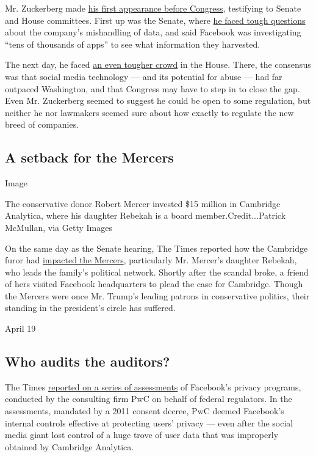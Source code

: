 Mr. Zuckerberg made
\href{https://www.nytimes.com/2018/04/10/us/politics/zuckerberg-facebook-senate-hearing.html}{his
first appearance before Congress}, testifying to Senate and House
committees. First up was the Senate, where
\href{https://www.nytimes.com/2018/04/10/us/politics/mark-zuckerberg-testimony.html}{he
faced tough questions} about the company's mishandling of data, and said
Facebook was investigating ``tens of thousands of apps'' to see what
information they harvested.

The next day, he faced
\href{https://www.nytimes.com/2018/04/11/business/zuckerberg-facebook-congress.html}{an
even tougher crowd} in the House. There, the consensus was that social
media technology --- and its potential for abuse --- had far outpaced
Washington, and that Congress may have to step in to close the gap. Even
Mr. Zuckerberg seemed to suggest he could be open to some regulation,
but neither he nor lawmakers seemed sure about how exactly to regulate
the new breed of companies.

\hypertarget{a-setback-for-the-mercers}{%
\subsection{A setback for the Mercers}\label{a-setback-for-the-mercers}}

Image

The conservative donor Robert Mercer invested \$15 million in Cambridge
Analytica, where his daughter Rebekah is a board member.Credit...Patrick
McMullan, via Getty Images

On the same day as the Senate hearing, The Times reported how the
Cambridge furor had
\href{https://www.nytimes.com/2018/04/10/us/politics/mercer-family-cambridge-analytica.html}{impacted
the Mercers}, particularly Mr. Mercer's daughter Rebekah, who leads the
family's political network. Shortly after the scandal broke, a friend of
hers visited Facebook headquarters to plead the case for Cambridge.
Though the Mercers were once Mr. Trump's leading patrons in conservative
politics, their standing in the president's circle has suffered.

April 19

\hypertarget{who-audits-the-auditors}{%
\subsection{Who audits the auditors?}\label{who-audits-the-auditors}}

The Times
\href{https://www.nytimes.com/2018/04/19/technology/facebook-audit-cambridge-analytica.html}{reported
on a series of assessments} of Facebook's privacy programs, conducted by
the consulting firm PwC on behalf of federal regulators. In the
assessments, mandated by a 2011 consent decree, PwC deemed Facebook's
internal controls effective at protecting users' privacy --- even after
the social media giant lost control of a huge trove of user data that
was improperly obtained by Cambridge Analytica.

